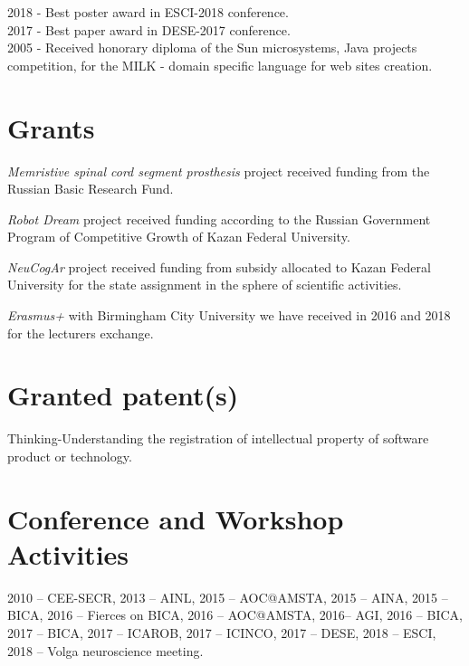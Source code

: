 \documentclass{moderncv}
\begin{document}
2018 - Best poster award in ESCI-2018 conference.\\
2017 - Best paper award in DESE-2017 conference.\\
2005 - Received honorary diploma of the Sun microsystems, Java projects competition, for the MILK - domain specific language for web sites creation.\\

\section{Grants}

\emph{Memristive spinal cord segment prosthesis} project received funding from the Russian Basic Research Fund.

\emph{Robot Dream} project received funding according to the Russian Government Program of Competitive Growth of Kazan Federal University.

\emph{NeuCogAr} project received funding from subsidy allocated to Kazan Federal University for the state assignment in the sphere of scientific activities.

\emph{Erasmus+} with Birmingham City University we have received in 2016 and 2018 for the lecturers exchange. 

\section{Granted patent(s)}

Thinking-Understanding the registration of intellectual property of software product or technology.

 
\nocite{*}
\printbibliography[title={Papers}]

\cvitem{}{}

\section{Conference and Workshop Activities}

2010 -- CEE-SECR, 2013 -- AINL, 2015 -- AOC@AMSTA, 2015 -- AINA, 2015 -- BICA, 2016 -- Fierces on BICA, 2016 -- AOC@AMSTA, 2016-- AGI, 2016 -- BICA, 2017 -- BICA, 2017 -- ICAROB, 2017 -- ICINCO, 2017 -- DESE, 2018 -- ESCI, 2018 -- Volga neuroscience meeting.
\end{document}
